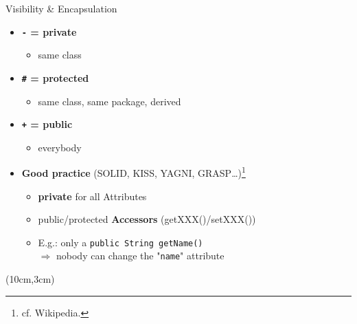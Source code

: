 \documentclass[English,t,%
hyperref={%
    pdftitle={FISA-DE2 OOP in Java},%
    pdfauthor={Guillaume Muller},%
    pdfsubject={OOP in Java},%
    pdfkeywords={OOP,Java}%
    },%
xcolor={pdftex,svgnames} %
]{beamer}
\begin{document}
\begin{frame}{Visibility \& Encapsulation}

  \begin{itemize}
%
    \item<1-> \textbf{\texttt{-} = private}
    \begin{itemize}
      \item same class
    \end{itemize}
%
    \item<1-> \textbf{\texttt{\#} = protected}
    \begin{itemize}
      \item same class, same package, derived
    \end{itemize}
%
    \item<1-> \textbf{\texttt{+} = public}
    \begin{itemize}
      \item everybody
    \end{itemize}
%
    \vspace{3em}
    \item<2> \textbf{Good practice} (SOLID, KISS, YAGNI, GRASP\ldots{})\footnote{cf. Wikipedia.}
    \begin{itemize}
      \item \textbf{private} for all Attributes
      \item public/protected \textbf{Accessors} (getXXX()/setXXX())
      \vspace{.5em}
      \item E.g.: only a \texttt{public String getName()}\\
      $\Rightarrow$ nobody can change the "\texttt{name}" attribute
    \end{itemize}
%
 \end{itemize}

  \begin{textblock*}{3cm}(10cm,3cm)%
  \end{textblock*}


\end{frame}
\end{document}
